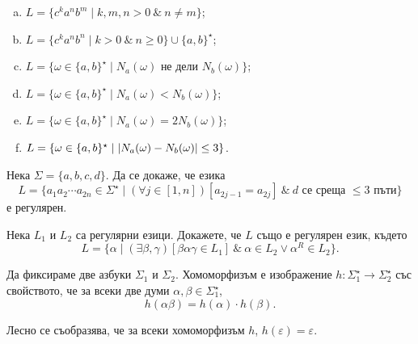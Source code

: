 \begin{problem}
\begin{enumerate}[a)]
  \item
    $L = \{c^ka^nb^m \mid k,m,n > 0\ \&\ n \neq m\}$;
  \item
    $L = \{c^ka^nb^n \mid k > 0\ \&\ n \geq 0\}\cup\{a,b\}^\star$;
  \item
    $L = \{\omega \in \{a,b\}^\star \mid N_a(\omega)\text{ не дели }N_b(\omega)\}$;
  \item
    $L = \{\omega \in \{a,b\}^\star \mid N_a(\omega) < N_b(\omega)\}$;
  \item
    $L = \{\omega \in \{a,b\}^\star \mid N_a(\omega) = 2N_b(\omega)\}$;
  \item
    $L = \{\omega \in \{a,b\}^\star \mid \lvert{N_a(\omega) - N_b(\omega)}\rvert \leq 3\}$.
  \end{enumerate}
\end{problem}


\begin{problem}
  Нека $\Sigma = \{a,b,c,d\}$.
  Да се докаже, че езика 
  \[L = \{a_1a_2\cdots a_{2n} \in \Sigma^\star \mid (\forall j \in [1,n])[a_{2j-1} = a_{2j}]\ \&\ d\text{ се среща $\leq 3$ пъти}\}\]
  е регулярен.
\end{problem}

\begin{problem}
  Нека $L_1$ и $L_2$ са регулярни езици. Докажете, че $L$ също е регулярен език, където
  \[L = \{\alpha \mid (\exists \beta,\gamma)[\beta\alpha\gamma \in L_1]\ \&\ \alpha \in L_2 \vee \alpha^R \in L_2\}.\]
\end{problem}

\begin{dfn}
  Да фиксираме две азбуки $\Sigma_1$ и $\Sigma_2$.
  Хомоморфизъм е изображение $h:\Sigma^\star_1 \to \Sigma^\star_2$ със свойството, че
  за всеки две думи $\alpha,\beta\in\Sigma^\star_1$,
  \[h(\alpha\beta) = h(\alpha)\cdot h(\beta).\]
\end{dfn}

Лесно се съобразява, че за всеки хомоморфизъм $h$, $h(\varepsilon) = \varepsilon$.

